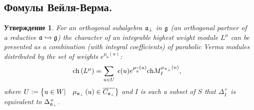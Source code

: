 \documentclass[12pt]{article}
\newtheorem{statement}{Утверждение}
\theoremstyle{definition}
\begin{document}
\subsection{Фомулы Вейля-Верма.}

\begin{statement}
\bigskip For an orthogonal subalgebra $\frak{a}_{\perp }$ in $\frak{g}$ (an
orthogonal partner of a reductive $\frak{a}\hookrightarrow \frak{g}$) the
character of an integrable highest weight module $L^{\mu }$ can be presented
as a combination (with integral coefficients) of parabolic Verma modules
distributed by the set of weights $e^{\mu _{\widetilde{\mathfrak{a}}}\left(
u\right) }$:
\begin{equation}
\mathrm{ch}\left( L^{\mu }\right) =\sum_{u\in U}\;\epsilon (u)e^{\mu _{%
\widetilde{\frak{a}}}\left( u\right) }\mathrm{ch}M_{I}^{\mu _{\frak{a}%
_{\perp }}\left( u\right) },  \label{gen Weyl-Verma}
\end{equation}
where $U:=\left\{ u\in W|\quad \mu _{\frak{a}_{\perp }}\left( u\right) \in
\overline{C_{\frak{a}_{\perp }}}\right\} $ and $I$ is such a subset of $S$ that
$\Delta _{I}^{+}$ is
equivalent to $\Delta _{\frak{a}_{\perp }}^{+}$.
\end{statement}
\end{document}
